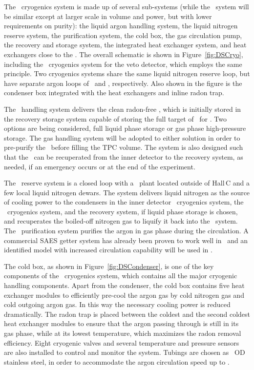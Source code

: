 The \UAr\ cryogenics system is made up of several sub-systems (while the \AAr\ system will be similar except at larger scale in volume and power, but with lower requirements on purity): the liquid argon handling system, the liquid nitrogen reserve system, the purification system, the cold box, the gas circulation pump, the recovery and storage system, the integrated heat exchanger system, and heat exchangers close to the \TPC.  The overall schematic is shown in Figure~\ref{fig:DSCryo}, including the \AAr\ cryogenics system for the veto detector, which employs the same principle.  Two cryogenics systems share the same liquid nitrogen reserve loop, but have separate argon loops of \UAr\ and \AAr, respectively.  Also shown in the figure is the condenser box integrated with the heat exchangers and inline radon trap. 

The \LAr\ handling system delivers the clean radon-free \UAr, which is initially stored in the recovery storage system capable of storing the full target of \UAr\ for \DSks.  Two options are being considered, full liquid phase storage or gas phase high-pressure storage. The gas handling system will be adopted to either solution in order to pre-purify the \UAr\ before filling the TPC volume.   The system is also designed such that the \UAr\ can be recuperated from the inner detector to the recovery system, as needed, if an emergency occurs or at the end of the experiment.

The \LIN\ reserve system is a closed loop with a \LIN\ plant located outside of Hall\,C and a few local liquid nitrogen dewars.  The system delivers liquid nitrogen as the source of cooling power to the condensers in the inner detector \UAr\ cryogenics system, the \AAr\ cryogenics system, and the recovery system, if liquid phase storage is chosen, and recuperates the boiled-off nitrogen gas to liquify it back into the \LIN\ system.  The \UAr\ purification system purifies the argon in gas phase during the circulation.  A commercial SAES getter system has already been proven to work well in \DSfs\ and an identified model with increased circulation capability will be used in \DSks.

The cold box, as shown in Figure~\ref{fig:DSCondenser}, is one of the key components of the \DSks\ cryogenics system, which contains all the major cryogenic handling components.  Apart from the condenser, the cold box contains five heat exchanger modules to efficiently pre-cool the argon gas by cold nitrogen gas and cold outgoing argon gas.  In this way the necessary cooling power is reduced dramatically.  The radon trap is placed between the coldest and the second coldest heat exchanger modules to ensure that the argon passing through is still in its gas phase, while at its lowest temperature, which maximizes the radon removal efficiency.  Eight cryogenic valves and several temperature and pressure sensors are also installed to control and monitor the system.  Tubings are chosen as \DSkCryogenicsTubesDiameter\ OD stainless steel, in order to accommodate the argon circulation speed up to \DSkCryogenicsGasFlowTotal. 

